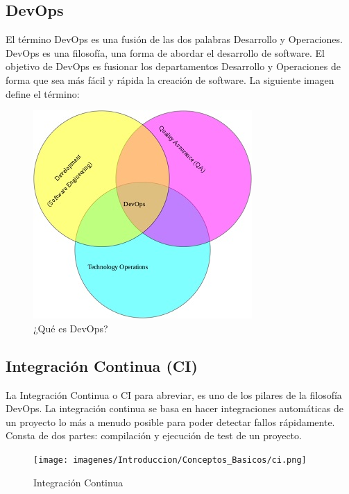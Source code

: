 	\subsection{DevOps}
		\begin{text}
			El término DevOps es una fusión de las dos palabras Desarrollo y Operaciones. DevOps es una filosofía, una forma de abordar el desarrollo de software. El objetivo de DevOps es fusionar los departamentos Desarrollo y Operaciones de forma que sea más fácil y rápida la creación de software. La siguiente imagen define el término:
			
			\begin{figure}[!hbt]
				\centering
				\includegraphics[scale=0.75]{imagenes/Introduccion/Conceptos_Basicos/devops.jpg}
				\caption[¿Qué es DevOps?]{¿Qué es DevOps? \cite{WhatIsDe1:online}}
				\label{termino_devops}
			\end{figure}
			 
		\end{text}
	\subsection{Integración Continua (CI)}
		\begin{text}
			La Integración Continua o CI para abreviar, es uno de los pilares de la filosofía DevOps. La integración continua se basa en hacer integraciones automáticas de un proyecto lo más a menudo posible para poder detectar fallos rápidamente. Consta de dos partes: compilación y ejecución de test de un proyecto.
			
			\begin{figure}[!hbt]
				\centering
				\texttt{[image: imagenes/Introduccion/Conceptos\_Basicos/ci.png]}
				\caption[Integración Continua]{Integración Continua \cite{Alcanzan90:online} }
				\label{integracion_continua} 
			\end{figure}
		\end{text}
